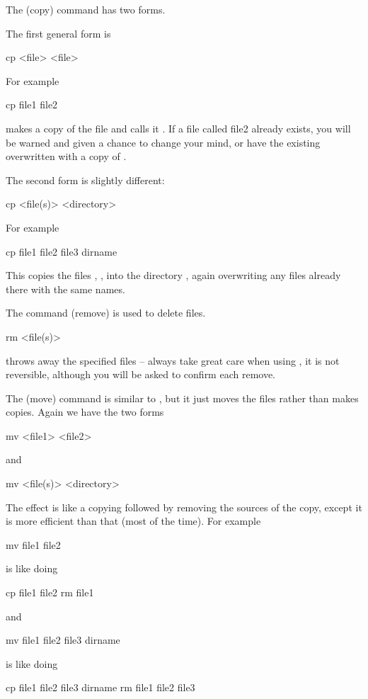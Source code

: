 \noindent The  (copy) command has two forms.

The first general form is
\begin{ttoutenv}
  cp <file> <file> \return
\end{ttoutenv}

For example

\begin{ttoutenv}
  cp file1 file2 \return
\end{ttoutenv}
%
makes a copy of the file  and calls it .  If
a file called file2 already exists, you will be warned and given a
chance to change your mind, or have the existing  overwritten
with a copy of .

The second form is slightly different:
\begin{ttoutenv}
  cp <file(s)> <directory>
\end{ttoutenv}
%
For example

\begin{ttoutenv}
  cp file1 file2 file3 dirname \return
\end{ttoutenv}

This copies the files , ,  into
the directory , again overwriting any files already
there with the same names.

The command  (remove) is used to delete files.
\begin{ttoutenv}
  rm <file(s)>
\end{ttoutenv}
%
throws away the specified files -- always take great care when using
, it is not reversible, although you will be asked to
confirm each remove.

The  (move) command is similar to , but it just moves
the files rather than makes copies. Again we have the two forms
\begin{ttoutenv}
  mv <file1> <file2> \return
\end{ttoutenv}
and
\begin{ttoutenv}
  mv <file(s)> <directory> \return
\end{ttoutenv}

The effect is like a copying followed by removing the sources of the copy,
except it is more efficient than that (most of the time).
For example
\begin{ttoutenv}
  mv file1 file2 \return
\end{ttoutenv}
is like doing
\begin{ttoutenv}
  cp file1 file2 \return
  rm file1
\end{ttoutenv}
and
\begin{ttoutenv}
  mv file1 file2 file3 dirname \return
\end{ttoutenv}
is like doing
\begin{ttoutenv}
  cp file1 file2 file3 dirname \return
  rm file1 file2 file3
\end{ttoutenv}

